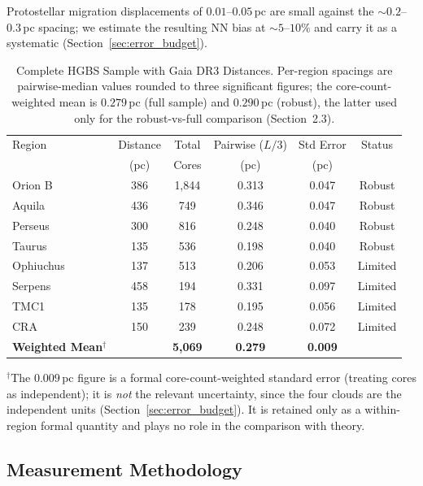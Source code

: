 \documentclass[usenatbib,twoside,twocolumn]{mnras}
\begin{document}
Protostellar migration displacements of $0.01$--$0.05$\,pc \citep{Kirk2016, Mattern2018} are small against the $\sim0.2$--$0.3$\,pc spacing; we estimate the resulting NN bias at $\sim5$--$10\%$ and carry it as a systematic (Section~\ref{sec:error_budget}).

\begin{table}
\caption{Complete HGBS Sample with Gaia DR3 Distances. Per-region spacings are pairwise-median values rounded to three significant figures; the core-count-weighted mean is $0.279$\,pc (full sample) and $0.290$\,pc (robust), the latter used only for the robust-vs-full comparison (Section~2.3).}
\label{tab:sample}
\begin{tabular}{lccccc}
\toprule
Region & Distance & Total & Pairwise ($L/3$) & Std Error & Status \\
       & (pc)   & Cores & (pc)   & (pc)      &  \\
\midrule
Orion B  & 386 & 1,844 & 0.313 & 0.047 & Robust \\
Aquila   & 436 & 749   & 0.346 & 0.047 & Robust \\
Perseus  & 300 & 816   & 0.248 & 0.040 & Robust \\
Taurus   & 135 & 536   & 0.198 & 0.040 & Robust \\
Ophiuchus& 137 & 513   & 0.206 & 0.053 & Limited \\
Serpens  & 458 & 194   & 0.331 & 0.097 & Limited \\
TMC1     & 135 & 178   & 0.195 & 0.056 & Limited \\
CRA      & 150 & 239   & 0.248 & 0.072 & Limited \\
\midrule
\textbf{Weighted Mean}$^\dagger$ &  & \textbf{5,069} & \textbf{0.279} & \textbf{0.009} &  \\
\bottomrule
\end{tabular}
\par\vspace{2pt}
\footnotesize $^\dagger$The $0.009$\,pc figure is a formal core-count-weighted standard error (treating cores as independent); it is \emph{not} the relevant uncertainty, since the four clouds are the independent units (Section~\ref{sec:error_budget}). It is retained only as a within-region formal quantity and plays no role in the comparison with theory.
\end{table}

\subsection{Measurement Methodology}
\end{document}
